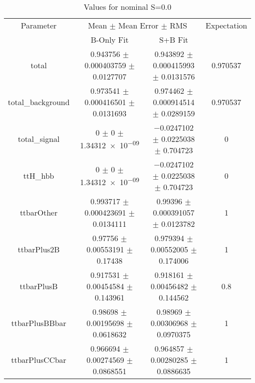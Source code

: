 \begin{table}
\centering
\caption{Values for nominal S=0.0}
\begin{tabular}{cccc}
\toprule
Parameter & \multicolumn{2}{c}{Mean $\pm$ Mean Error $\pm$ RMS} & Expectation\\
 & B-Only Fit & S+B Fit & \\
\midrule
total & \num{0.943756} $\pm$ \num{0.000403759} $\pm$ \num{0.0127707} & \num{0.943892} $\pm$ \num{0.000415993} $\pm$ \num{0.0131576} & \num{0.970537}\\
total\_background & \num{0.973541} $\pm$ \num{0.000416501} $\pm$ \num{0.0131693} & \num{0.974462} $\pm$ \num{0.000914514} $\pm$ \num{0.0289159} & \num{0.970537}\\
total\_signal & \num{0} $\pm$ \num{0} $\pm$ \num{1.34312e-09} & \num{-0.0247102} $\pm$ \num{0.0225038} $\pm$ \num{0.704723} & \num{0}\\
ttH\_hbb & \num{0} $\pm$ \num{0} $\pm$ \num{1.34312e-09} & \num{-0.0247102} $\pm$ \num{0.0225038} $\pm$ \num{0.704723} & \num{0}\\
ttbarOther & \num{0.993717} $\pm$ \num{0.000423691} $\pm$ \num{0.0134111} & \num{0.99396} $\pm$ \num{0.000391057} $\pm$ \num{0.0123782} & \num{1}\\
ttbarPlus2B & \num{0.97756} $\pm$ \num{0.00553191} $\pm$ \num{0.17438} & \num{0.979394} $\pm$ \num{0.00552005} $\pm$ \num{0.174006} & \num{1}\\
ttbarPlusB & \num{0.917531} $\pm$ \num{0.00454584} $\pm$ \num{0.143961} & \num{0.918161} $\pm$ \num{0.00456482} $\pm$ \num{0.144562} & \num{0.8}\\
ttbarPlusBBbar & \num{0.98698} $\pm$ \num{0.00195698} $\pm$ \num{0.0618632} & \num{0.98969} $\pm$ \num{0.00306968} $\pm$ \num{0.0970375} & \num{1}\\
ttbarPlusCCbar & \num{0.966694} $\pm$ \num{0.00274569} $\pm$ \num{0.0868551} & \num{0.964857} $\pm$ \num{0.00280285} $\pm$ \num{0.0886635} & \num{1}\\
\bottomrule
\end{tabular}
\end{table}